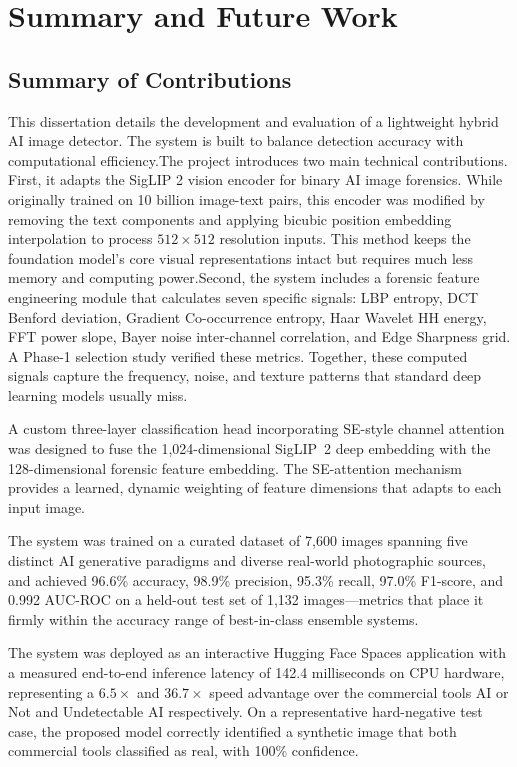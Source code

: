 \chapter{Summary and Future Work}
\label{ch:summary}

\section{Summary of Contributions}

This dissertation details the development and evaluation of a lightweight hybrid AI image detector. The system is built to balance detection accuracy with computational efficiency.The project introduces two main technical contributions. First, it adapts the SigLIP 2 vision encoder \cite{tschannen2025siglip2} for binary AI image forensics. While originally trained on 10 billion image-text pairs, this encoder was modified by removing the text components and applying bicubic position embedding interpolation to process $512 \times 512$ resolution inputs. This method keeps the foundation model's core visual representations intact but requires much less memory and computing power.Second, the system includes a forensic feature engineering module that calculates seven specific signals: LBP entropy, DCT Benford deviation, Gradient Co-occurrence entropy, Haar Wavelet HH energy, FFT power slope, Bayer noise inter-channel correlation, and Edge Sharpness grid. A Phase-1 selection study verified these metrics. Together, these computed signals capture the frequency, noise, and texture patterns that standard deep learning models usually miss.

A custom three-layer classification head incorporating SE-style channel attention was designed to fuse the 1,024-dimensional SigLIP~2 deep embedding with the 128-dimensional forensic feature embedding. The SE-attention mechanism provides a learned, dynamic weighting of feature dimensions that adapts to each input image.

The system was trained on a curated dataset of 7,600 images spanning five distinct AI generative paradigms and diverse real-world photographic sources, and achieved 96.6\% accuracy, 98.9\% precision, 95.3\% recall, 97.0\% F1-score, and 0.992 AUC-ROC on a held-out test set of 1,132 images---metrics that place it firmly within the accuracy range of best-in-class ensemble systems.

The system was deployed as an interactive Hugging Face Spaces application with a measured end-to-end inference latency of 142.4 milliseconds on CPU hardware, representing a $6.5\times$ and $36.7\times$ speed advantage over the commercial tools AI or Not and Undetectable AI respectively. On a representative hard-negative test case, the proposed model correctly identified a synthetic image that both commercial tools classified as real, with 100\% confidence.


